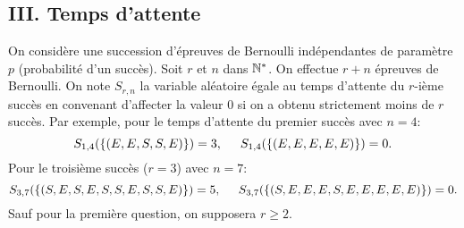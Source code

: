 \subsection*{III. Temps d'attente}
 On considère une succession d'épreuves de Bernoulli indépendantes de paramètre $p$ (probabilité d'un \og succès\fg).\newline
 Soit $r$ et $n$ dans $\mathbb{N}^*$. On effectue $r + n$ épreuves de Bernoulli. On note $S_{r,n}$ la variable aléatoire égale au temps d'attente du $r$-ième succès en convenant d'affecter la valeur $0$ si on a obtenu strictement moins de $r$ succès.\newline
  Par exemple, pour le temps d'attente du premier succès avec $n=4$:  
\[  
   S_{1,4}(\left\lbrace (E,E,S,S,E)\right\rbrace) = 3, \hspace{0.5cm } S_{1,4}(\left\lbrace (E,E,E,E,E)\right\rbrace) = 0.
\]
Pour le troisième succès ($r=3$) avec $n=7$:
\[
   S_{3,7}(\left\lbrace (S,E,S,E,S,S,E,S,S,E)\right\rbrace) = 5, \hspace{0.5cm } S_{3,7}(\left\lbrace (S,E,E,E,S,E,E,E,E,E)\right\rbrace) = 0.  
\]
Sauf pour la première question, on supposera $r\geq 2$.
